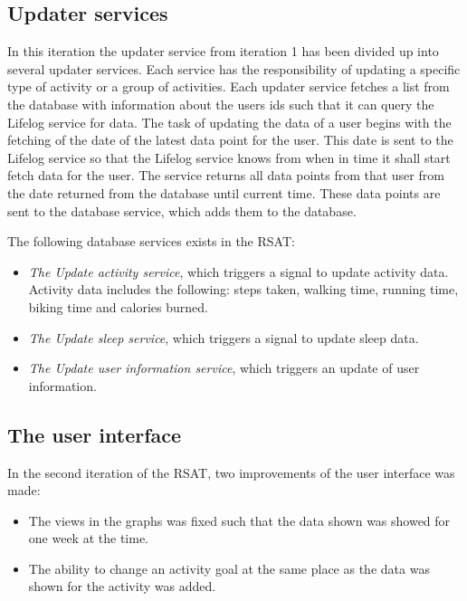 \documentclass{cslthse-msc}
\begin{document}
\subsection{Updater services}

In this iteration the updater service from iteration 1 has been divided up into several updater services. Each service has the responsibility of updating a specific type of activity or a group of activities. Each updater service fetches a list from the database with information about the users ids such that it can query the Lifelog service for data. The task of updating the data of a user begins with the fetching of the date of the latest data point for the user. This date is sent to the Lifelog service so that the Lifelog service knows from when in time it shall start fetch data for the user. The service returns all data points from that user from the date returned from the database until current time. These data points are sent to the database service, which adds them to the database. 

The following database services exists in the RSAT:

\begin{itemize}
\item \emph{The Update activity service}, which triggers a signal to update activity data. Activity data includes the following: steps taken, walking time, running time, biking time and calories burned.
\item \emph{The Update sleep service}, which triggers a signal to update sleep data.
\item \emph{The Update user information service}, which triggers an update of user information.
\end{itemize}


\subsection{The user interface}

In the second iteration of the RSAT, two improvements of the user interface was made:

\begin{itemize}
\item The views in the graphs was fixed such that the data shown was showed for one week at the time. 
\item The ability to change an activity goal at the same place as the data was shown for the activity was added.
\end{itemize}
\end{document}
